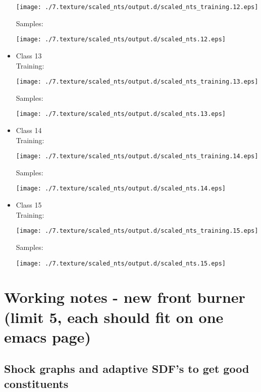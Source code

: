 \documentclass{book}
\begin{document}
\begin{itemize}
\texttt{[image: ./7.texture/scaled\_nts/output.d/scaled\_nts\_training.12.eps]}

Samples:

\texttt{[image: ./7.texture/scaled\_nts/output.d/scaled\_nts.12.eps]}


\item Class 13\\
\label{sec-3_8_1_13}%
Training:

\texttt{[image: ./7.texture/scaled\_nts/output.d/scaled\_nts\_training.13.eps]}

Samples:

\texttt{[image: ./7.texture/scaled\_nts/output.d/scaled\_nts.13.eps]}


\item Class 14\\
\label{sec-3_8_1_14}%
Training:

\texttt{[image: ./7.texture/scaled\_nts/output.d/scaled\_nts\_training.14.eps]}

Samples:

\texttt{[image: ./7.texture/scaled\_nts/output.d/scaled\_nts.14.eps]}


\item Class 15\\
\label{sec-3_8_1_15}%
Training:

\texttt{[image: ./7.texture/scaled\_nts/output.d/scaled\_nts\_training.15.eps]}

Samples:

\texttt{[image: ./7.texture/scaled\_nts/output.d/scaled\_nts.15.eps]}



\end{itemize} %
\chapter{Working notes - new front burner (limit 5, each should fit on one emacs page)}
\label{sec-4}
\section{Shock graphs and adaptive SDF's to get good constituents}
\label{sec-4_1}
\end{document}
